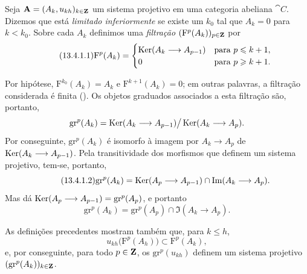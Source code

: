 \begin{env}[13.4.1]
\label{0.13.4.1}
Seja
$\mathbf{A}=(A_k,u_{kh})_{k\in\mathbf{Z}}$ um sistema projetivo em uma
categoria abeliana $\cat{C}$.
Dizemos que está \emph{limitado inferiormente} se existe um $k_0$ tal que
$A_k=0$ para $k<k_0$.
Sobre cada $A_k$ definimos uma \emph{filtração}
$(\mathrm{F}^p(A_k))_{p\in\mathbf{Z}}$ por
\begin{equation}
\label{0.13.4.1.1}
\tag{13.4.1.1}
  \mathrm{F}^p(A_k)=
  \begin{cases}
    \Ker(A_k\longrightarrow A_{p-1}) & \text{para }p\leq k+1,\\
    0 & \text{para }p\geq k+1.
  \end{cases}
\end{equation}

Por hipótese,
$\mathrm{F}^{k_0}(A_k)=A_k$ e
$\mathrm{F}^{k+1}(A_k)=0$; em outras palavras, a filtração considerada
é finita ().
Os objetos graduados associados a esta filtração são, portanto,
\[
  \mathrm{gr}^p(A_k)
  =
  \operatorname{Ker}(A_k\longrightarrow A_{p-1})
  \big/
  \operatorname{Ker}(A_k\longrightarrow A_p).
\]
Por conseguinte, $\mathrm{gr}^p(A_k)$ é isomorfo à imagem por
$A_k\longrightarrow A_p$ de
$\operatorname{Ker}(A_k\longrightarrow A_{p-1})$.
Pela transitividade dos morfismos que definem um sistema projetivo,
tem-se, portanto,
\begin{equation}
\label{0.13.4.1.2}
\tag{13.4.1.2}
  \mathrm{gr}^p(A_k)
  =
  \Ker(A_p\longrightarrow A_{p-1})
  \cap
  \Im(A_k\longrightarrow A_p).
\end{equation}
Mas  dá
$\operatorname{Ker}(A_p\longrightarrow A_{p-1})=\mathrm{gr}^p(A_p)$, e portanto
\begin{equation}
\label{0.13.4.1.3}
\tag{13.4.1.3}
  \mathrm{gr}^p(A_k)
  =
  \mathrm{gr}^p(A_p)
  \cap
  \Im(A_k\longrightarrow A_p).
\end{equation}

As definições precedentes mostram também que, para $k\leq h$,
\[
  u_{kh}\bigl(\mathrm{F}^p(A_h)\bigr)
  \subset
  \mathrm{F}^p(A_k),
\]
e, por conseguinte, para todo $p\in\mathbf{Z}$, os
$\mathrm{gr}^p(u_{kh})$ definem um sistema projetivo
$(\mathrm{gr}^p(A_k))_{k\in\mathbf{Z}}$.
\end{env}

